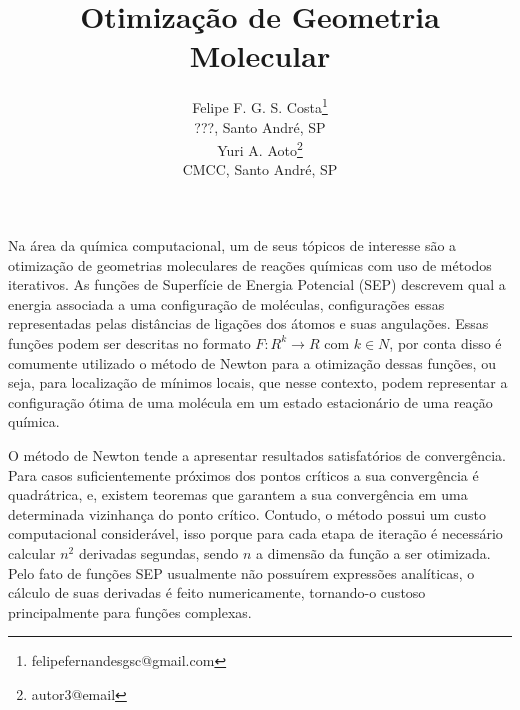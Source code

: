 \documentclass{pssbmac}
\begin{document}

\title{Otimização de Geometria Molecular}

\author{
    {\large Felipe F. G. S. Costa}\thanks{felipefernandesgsc@gmail.com} \\ %
    {\small ???, Santo André, SP} \\ %
    {\large Yuri A. Aoto}\thanks{autor3@email}  \\ %
    {\small CMCC, Santo André, SP} \\ %
}
\criartitulo



Na área da química computacional, um de seus tópicos de interesse são a otimização de geometrias moleculares de reações químicas com uso de métodos iterativos. As funções de Superfície de Energia Potencial (SEP) descrevem qual a energia associada a uma configuração de moléculas, configurações essas representadas pelas distâncias de ligações dos átomos e suas angulações. Essas funções podem ser descritas no formato $F: R^k\to R$ com $k \in N$, por conta disso é comumente utilizado o método de Newton para a otimização dessas funções, ou seja, para localização de mínimos locais, que nesse contexto, podem representar a configuração ótima de uma molécula em um estado estacionário de uma reação química.

O método de Newton tende a apresentar resultados satisfatórios de convergência. Para casos suficientemente próximos dos pontos críticos a sua convergência é quadrátrica, e, existem teoremas\cite{calculo_numerico_aplicado} que garantem a sua convergência em uma determinada vizinhança do ponto crítico. Contudo, o método possui um custo computacional considerável, isso porque para cada etapa de iteração é necessário calcular $n^2$ derivadas segundas, sendo $n$ a dimensão da função a ser otimizada. Pelo fato de funções SEP usualmente não possuírem expressões analíticas, o cálculo de suas derivadas é feito numericamente, tornando-o custoso principalmente para funções complexas.
\end{document}
